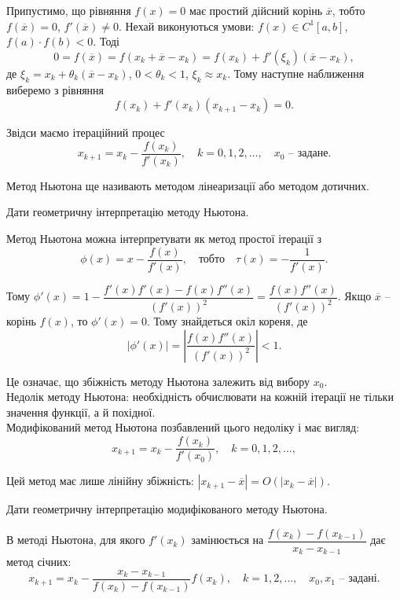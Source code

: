 Припустимо, що рівняння $f (x) = 0$ має простий дійсний корінь $\overline{x}$, тобто $f (\overline{x}) = 0$, $f'(\overline{x}) \ne 0$. Нехай виконуються умови: $f (x)\in C^1 [a,b]$, $f (a)\cdot f (b) < 0$. Тоді 
\[0 = f (\overline{x}) = f (x_k + \overline{x} - x_k ) = f (x_k ) + f'(\xi_k )(\overline{x} - x_k ),\] 
де $\xi_k=x_k+\theta_k(\overline{x}-x_k)$, $0 < \theta_k < 1$, $\xi_k \approx x_k$. Тому наступне наближення виберемо з рівняння 
\[ f(x_k) + f'(x_k) (x_{k+1}-x_k) = 0.\]

Звідси маємо ітераційний процес
\[ x_{k+1} = x_k - \dfrac{f(x_k)}{f'(x_k)}, \quad k = 0,1,2,\ldots, \quad x_0\text{ -- задане}. \]

Метод Ньютона ще називають методом лінеаризації або методом дотичних.

\begin{problem} 
	Дати геометричну інтерпретацію методу Ньютона.
\end{problem}

Метод Ньютона можна інтерпретувати як метод простої ітерації з \[ \phi(x) = x - \dfrac{f(x)}{f'(x)}, \quad \text{тобто} \quad \tau(x) = - \dfrac{1}{f'(x)}. \]

Тому $\phi'(x) = 1 - \dfrac{f'(x)f'(x)-f(x)f''(x)}{(f'(x))^2} = \dfrac{f(x)f''(x)}{(f'(x))^2}$. Якщо $\overline{x}$ -- корінь $f(x)$, то $\phi'(x) = 0$. Тому знайдеться окіл кореня, де \[ |\phi'(x)| = \left|\dfrac{f(x)f''(x)}{(f'(x))^2}\right|<1.\]

Це означає, що збіжність методу Ньютона залежить від вибору $x_0$. \\

Недолік методу Ньютона: необхідність обчислювати на кожній ітерації не тільки значення функції, а й похідної. \\

Модифікований метод Ньютона позбавлений цього недоліку і має вигляд:
\[ x_{k+1} = x_k - \dfrac{f(x_k)}{f'(x_0)}, \quad k=0,1,2,\ldots, \]

Цей метод має лише лінійну збіжність: $|x_{k+1} - \overline{x}| = O(|x_k-\overline{x}|)$.
\begin{problem} 
	Дати геометричну інтерпретацію модифікованого методу Ньютона.
\end{problem}

В методі Ньютона, для якого $f'(x_k)$ замінюється на $\dfrac{f(x_k)-f(x_{k-1})}{x_k-x_{k-1}}$ дає метод січних: \[ x_{k+1} = x_k - \dfrac{x_k-x_{k-1}}{f(x_k)-f(x_{k-1})}f(x_k), \quad k = 1,2,\ldots, \quad x_0,x_1\text{ -- задані}.\]

